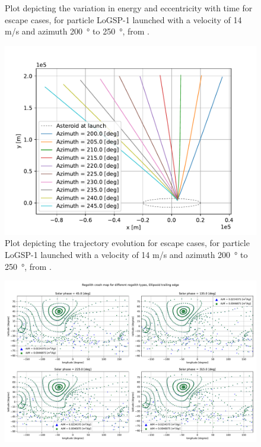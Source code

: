\documentclass[print]{tudelft-report}
\begin{document}
\begin{appendices}
\begin{figure}[htb]
    \caption{Plot depicting the variation in energy and eccentricity with time for escape cases, for particle LoGSP-1 launched with a velocity of 14 m/s and azimuth \SI{200}{\degree} to \SI{250}{\degree}, from \protect{}.}
    \label{fig:leadingEdge_logsp1_escape_energy_ecc_14ms_200_250_azim_solar225}
    \end{figure}
    \FloatBarrier
    \begin{figure}[htb]
    \centering
    \captionsetup{justification=centering}
    \includegraphics[width=\textwidth, height=0.6\textheight, keepaspectratio=true]{Results/Images/leading_edge_perturbations/logsp1_escape_traj_14ms_200_to_250_azim_solarPhase225.pdf}
    \caption{Plot depicting the trajectory evolution for escape cases, for particle LoGSP-1 launched with a velocity of 14 m/s and azimuth \SI{200}{\degree} to \SI{250}{\degree}, from \protect{}.}
    \label{fig:leadingEdge_logsp1_escape_traj_14ms_200_250_azim_solar225}
    \end{figure}
    \FloatBarrier
    \begin{figure}[htb]
    \centering
    \captionsetup{justification=centering}
    \includegraphics[angle=90, width=\textwidth, height=\textheight, keepaspectratio=true]{Results/Images/trailing_edge_perturbations/crashMap_3P2_density_1cm_5cm_radius.pdf}

\end{figure}
\end{appendices}
\end{document}
